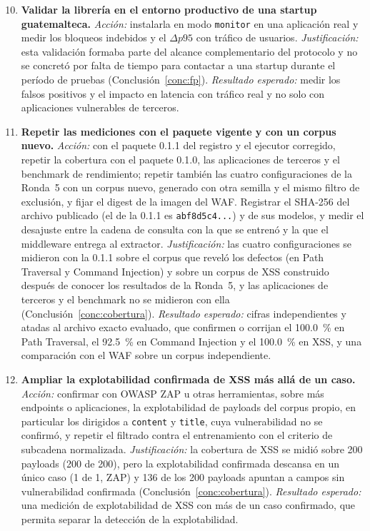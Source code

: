 \begin{enumerate}
    \setcounter{enumi}{9}
    \item \textbf{Validar la librería en el entorno productivo de una startup guatemalteca.}
    \textit{Acción:} instalarla en modo \texttt{monitor} en una aplicación real y medir los
    bloqueos indebidos y el $\Delta p95$ con tráfico de usuarios. \textit{Justificación:} esta
    validación formaba parte del alcance complementario del protocolo y no se concretó por falta de
    tiempo para contactar a una startup durante el período de pruebas (Conclusión~\ref{conc:fp}).
    \textit{Resultado esperado:} medir los falsos positivos y el impacto en latencia con tráfico
    real y no solo con aplicaciones vulnerables de terceros.

    \item \textbf{Repetir las mediciones con el paquete vigente y con un corpus nuevo.}
    \textit{Acción:} con el paquete 0.1.1 del registro y el ejecutor corregido, repetir la cobertura con
    el paquete 0.1.0, las aplicaciones de terceros y el benchmark de rendimiento; repetir también
    las cuatro configuraciones de la Ronda~5 con un corpus nuevo, generado con otra semilla y el
    mismo filtro de exclusión, y fijar el digest de la imagen del WAF. Registrar el SHA-256
    del archivo publicado (el de la 0.1.1 es \texttt{abf8d5c4...}) y de sus modelos, y medir el
    desajuste entre la cadena de consulta con la que se entrenó y la que el middleware entrega al
    extractor. \textit{Justificación:} las cuatro configuraciones se midieron con la 0.1.1 sobre el corpus
    que reveló los defectos (en Path Traversal y Command Injection) y sobre un corpus de XSS
    construido después de conocer los resultados de la Ronda~5, y las aplicaciones de terceros y
    el benchmark no se midieron con ella (Conclusión~\ref{conc:cobertura}). \textit{Resultado
    esperado:} cifras independientes y atadas al archivo exacto evaluado, que confirmen o corrijan
    el 100.0~\% en Path Traversal, el 92.5~\% en Command Injection y el 100.0~\% en XSS, y una
    comparación con el WAF sobre un corpus independiente.

        \item \textbf{Ampliar la explotabilidad confirmada de XSS más allá de un caso.}
    \textit{Acción:} confirmar con OWASP ZAP u otras herramientas, sobre más endpoints o
    aplicaciones, la explotabilidad de payloads del corpus propio, en particular los dirigidos a
    \texttt{content} y \texttt{title}, cuya vulnerabilidad no se confirmó, y repetir el filtrado
    contra el entrenamiento con el criterio de subcadena normalizada. \textit{Justificación:} la
    cobertura de XSS se midió sobre 200 payloads (200 de 200), pero la explotabilidad confirmada
    descansa en un único caso (1 de 1, ZAP) y 136 de los 200 payloads apuntan a campos sin
    vulnerabilidad confirmada (Conclusión~\ref{conc:cobertura}). \textit{Resultado esperado:} una
    medición de explotabilidad de XSS con más de un caso confirmado, que permita separar la
    detección de la explotabilidad.


\end{enumerate}
